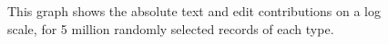 \begin{figure}[tbhp]
    \begin{center}
    \end{center}
    \caption[Measuring total edit and text contribution over revisions]{
        This graph shows the absolute text and edit contributions
        on a log scale, for 5 million randomly selected records
	of each type.
    }
    \label{fig-revs-contrib}
\end{figure}
%

